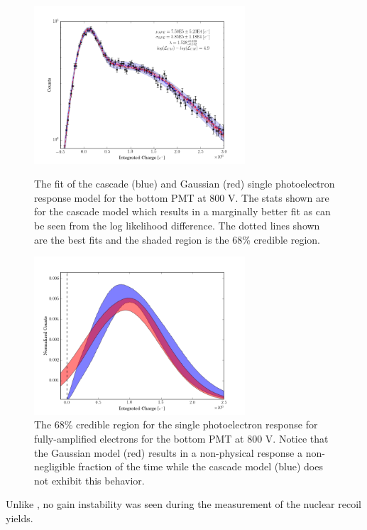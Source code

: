 \begin{figure}[p]
	\centering
	\includegraphics[width=0.7\textwidth]{nerix_pmt_best_fit}
	\caption{The fit of the cascade (blue) and Gaussian (red) single photoelectron response model for the bottom PMT at 800 V.  The stats shown are for the cascade model which results in a marginally better fit as can be seen from the log likelihood difference.  The dotted lines shown are the best fits and the shaded region is the 68\% credible region.}
	\label{fig:nerix_pmt_best_fit}

        \vspace{\floatsep}

	\centering
	\includegraphics[width=0.7\textwidth]{nerix_spe_response}
	\caption{The 68\% credible region for the single photoelectron response for fully-amplified electrons for the bottom PMT at 800 V.  Notice that the Gaussian model (red) results in a non-physical response a non-negligible fraction of the time while the cascade model (blue) does not exhibit this behavior.}
	\label{fig:nerix_spe_response}
\end{figure}


Unlike , no gain instability was seen during the measurement of the nuclear recoil yields.  

